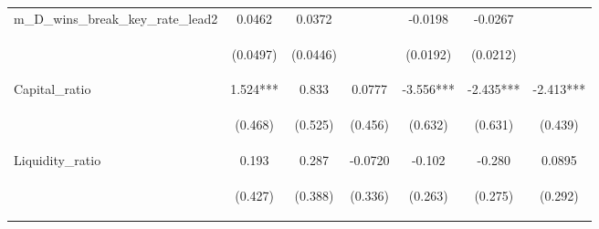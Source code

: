 \begin{tabular}{lcccccc}
m\_D\_wins\_break\_key\_rate\_lead2 & 0.0462 & 0.0372 &  & -0.0198 & -0.0267 &  \\
\vspace{4pt} & \begin{footnotesize}(0.0497)\end{footnotesize} & \begin{footnotesize}(0.0446)\end{footnotesize} & \begin{footnotesize}\end{footnotesize} & \begin{footnotesize}(0.0192)\end{footnotesize} & \begin{footnotesize}(0.0212)\end{footnotesize} & \begin{footnotesize}\end{footnotesize} \\
Capital\_ratio & 1.524*** & 0.833 & 0.0777 & -3.556*** & -2.435*** & -2.413*** \\
\vspace{4pt} & \begin{footnotesize}(0.468)\end{footnotesize} & \begin{footnotesize}(0.525)\end{footnotesize} & \begin{footnotesize}(0.456)\end{footnotesize} & \begin{footnotesize}(0.632)\end{footnotesize} & \begin{footnotesize}(0.631)\end{footnotesize} & \begin{footnotesize}(0.439)\end{footnotesize} \\
Liquidity\_ratio & 0.193 & 0.287 & -0.0720 & -0.102 & -0.280 & 0.0895 \\
\vspace{4pt} & \begin{footnotesize}(0.427)\end{footnotesize} & \begin{footnotesize}(0.388)\end{footnotesize} & \begin{footnotesize}(0.336)\end{footnotesize} & \begin{footnotesize}(0.263)\end{footnotesize} & \begin{footnotesize}(0.275)\end{footnotesize} & \begin{footnotesize}(0.292)\end{footnotesize} \\

\end{tabular}
